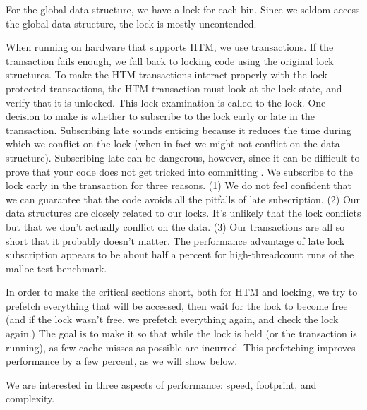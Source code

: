 \documentclass{sigplanconf}
\begin{document}
For the global data structure, we have a lock for each bin.  Since we
seldom access the global data structure, the lock is mostly
uncontended.

When running on hardware that supports HTM, we use transactions.  If
the transaction fails enough, we fall back to locking code using the
original lock structures.  To make the HTM transactions interact
properly with the lock-protected transactions, the HTM transaction
must look at the lock state, and verify that it is unlocked.  This
lock examination is called  to the lock.  One
decision to make is whether to subscribe to the lock early or late in
the transaction.  Subscribing late sounds enticing because it reduces
the time during which we conflict on the lock (when in fact we might
not conflict on the data structure).  Subscribing late can be
dangerous, however, since it can be difficult to prove that your code
does not get tricked into committing \cite{DiceHaKo14}.  We subscribe
to the lock early in the transaction for three reasons.  (1) We do not
feel confident that we can guarantee that the code avoids all the
pitfalls of late subscription.  (2) Our data structures are closely
related to our locks.  It's unlikely that the lock conflicts but that
we don't actually conflict on the data.  (3) Our transactions are all
so short that it probably doesn't matter.  The performance advantage
of late lock subscription appears to be about half a percent for
high-threadcount runs of the malloc-test benchmark.

In order to make the critical sections short, both for HTM and
locking, we try to prefetch everything that will be accessed, then
wait for the lock to become free (and if the lock wasn't free, we
prefetch everything again, and check the lock again.)  The goal is to
make it so that while the lock is held (or the transaction is
running), as few cache misses as possible are incurred.  This
prefetching improves performance by a few percent, as we will show
below.


We are interested in three aspects of performance: speed, footprint,
and complexity.
\end{document}
